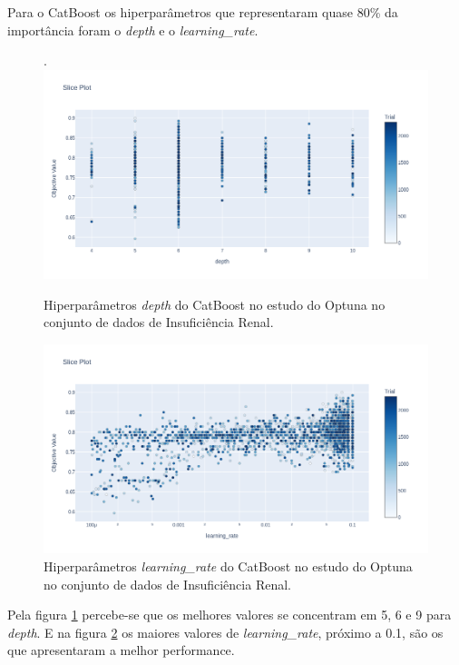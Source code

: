Para o CatBoost os hiperparâmetros que representaram quase 80\% da importância foram o \textit{depth} e o \textit{learning\_rate}.
\begin{figure}[H]
 \caption{Hiperparâmetros \textit{depth} do CatBoost no estudo do Optuna no conjunto de dados de Insuficiência Renal.}.
 \label{fig:op:kind:depth:cat}
 \centering
 \includegraphics[scale=0.3]{images/opatuna_catboost_depth_kindey.png}
\end{figure}
\begin{figure}[H]
 \caption{Hiperparâmetros \textit{learning\_rate} do CatBoost no estudo do Optuna no conjunto de dados de Insuficiência Renal.}
 \label{fig:op:kind:learn:cat}
 \centering
 \includegraphics[scale=0.3]{images/optuna_learning_rate-catboost_kindey.png}
\end{figure}
Pela figura \ref{fig:op:kind:depth:cat} percebe-se que os melhores valores se concentram em 5, 6 e 9 para \textit{depth}. E na figura \ref{fig:op:kind:learn:cat} os maiores valores de \textit{learning\_rate}, próximo a 0.1, são os que apresentaram a melhor performance.

